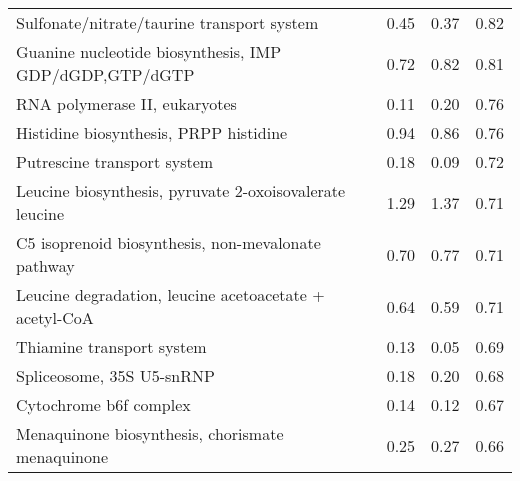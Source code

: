 \begin{sidewaystable}
\begin{center}
\begin{tabularx}{\textwidth}{Xlll}
Sulfonate/nitrate/taurine transport system & 0.45 & 0.37 & 0.82\\
Guanine nucleotide biosynthesis, IMP \textrightarrow{} GDP/dGDP,GTP/dGTP & 0.72 & 0.82 & 0.81\\
RNA polymerase II, eukaryotes & 0.11 & 0.20 & 0.76\\
Histidine biosynthesis, PRPP \textrightarrow{} histidine & 0.94 & 0.86 & 0.76\\
Putrescine transport system & 0.18 & 0.09 & 0.72\\
Leucine biosynthesis, pyruvate \textrightarrow{} 2-oxoisovalerate \textrightarrow{} leucine & 1.29 & 1.37 & 0.71\\
C5 isoprenoid biosynthesis, non-mevalonate pathway & 0.70 & 0.77 & 0.71\\
Leucine degradation, leucine \textrightarrow{} acetoacetate + acetyl-CoA & 0.64 & 0.59 & 0.71\\
Thiamine transport system & 0.13 & 0.05 & 0.69\\
Spliceosome, 35S U5-snRNP & 0.18 & 0.20 & 0.68\\
Cytochrome b6f complex & 0.14 & 0.12 & 0.67\\
Menaquinone biosynthesis, chorismate \textrightarrow{} menaquinone & 0.25 & 0.27 & 0.66\\
\bottomrule
\end{tabularx}
\end{center}
\end{sidewaystable}
